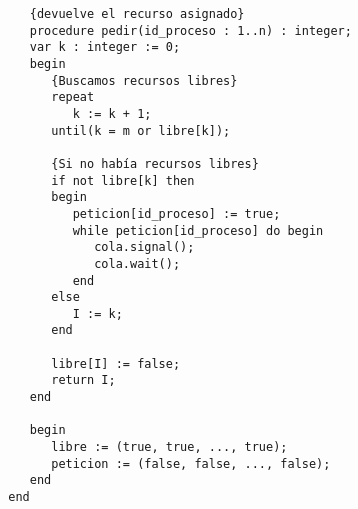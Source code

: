 \begin{ejercicio}
\begin{description}
\begin{verbatim}
           {devuelve el recurso asignado}
           procedure pedir(id_proceso : 1..n) : integer;
           var k : integer := 0;
           begin
              {Buscamos recursos libres}
              repeat
                 k := k + 1;
              until(k = m or libre[k]);

              {Si no había recursos libres}
              if not libre[k] then
              begin
                 peticion[id_proceso] := true;
                 while peticion[id_proceso] do begin
                    cola.signal();
                    cola.wait();
                 end
              else
                 I := k;
              end

              libre[I] := false;
              return I;
           end

           begin
              libre := (true, true, ..., true);
              peticion := (false, false, ..., false);
           end
        end
    \end{verbatim}
    \end{description}

\end{ejercicio}

